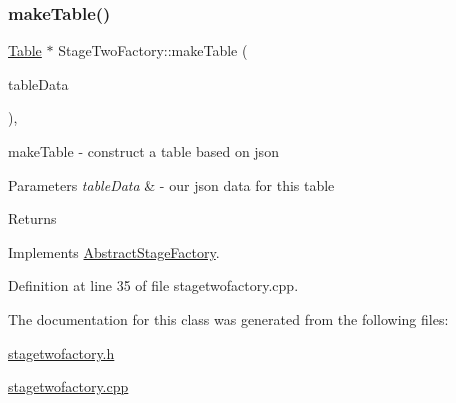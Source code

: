 \mbox{\label{class_stage_two_factory_aa532818e02bed0ea1f5c79a1a1487e71}} 
\subsubsection{\texorpdfstring{make\+Table()}{makeTable()}}
{\footnotesize\ttfamily \mbox{\hyperlink{class_table}{Table}} $\ast$ Stage\+Two\+Factory\+::make\+Table (\begin{DoxyParamCaption}\item[{const Q\+Json\+Object \&}]{table\+Data }\end{DoxyParamCaption})\hspace{0.3cm}{\ttfamily [override]}, {\ttfamily [virtual]}}



make\+Table -\/ construct a table based on json 


\begin{DoxyParams}{Parameters}
{\em table\+Data} & -\/ our json data for this table \\
\hline
\end{DoxyParams}
\begin{DoxyReturn}{Returns}

\end{DoxyReturn}


Implements \mbox{\hyperlink{class_abstract_stage_factory_a539c855ce9a09e08b7fcb3ffa7f0d3fd}{Abstract\+Stage\+Factory}}.



Definition at line 35 of file stagetwofactory.\+cpp.



The documentation for this class was generated from the following files\+:\begin{DoxyCompactItemize}
\item 
\mbox{\hyperlink{stagetwofactory_8h}{stagetwofactory.\+h}}\item 
\mbox{\hyperlink{stagetwofactory_8cpp}{stagetwofactory.\+cpp}}\end{DoxyCompactItemize}
